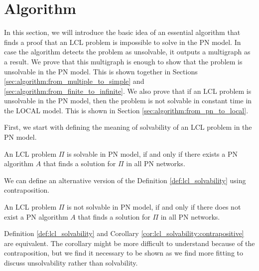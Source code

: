 
\section{Algorithm} \label{sec:algorithm}

In this section, we will introduce the basic idea of an essential algorithm that finds a proof that an LCL problem is impossible to solve in the PN model.
In case the algorithm detects the problem as unsolvable, it outputs a multigraph as a result.
We prove that this multigraph is enough to show that the problem is unsolvable in the PN model.
This is shown together in Sections \ref{sec:algorithm:from_multiple_to_simple} and \ref{sec:algorithm:from_finite_to_infinite}.
We also prove that if an LCL problem is unsolvable in the PN model, then the problem is not solvable in constant time in the LOCAL model.
This is shown in Section \ref{sec:algorithm:from_pn_to_local}.

%
First, we start with defining the meaning of solvability of an LCL problem in the PN model.
\begin{definition} \label{def:lcl_solvability}
    An LCL problem $\Pi$ is solvable in PN model, if and only if there exists a PN algorithm $A$ that finds a solution for $\Pi$ in all PN networks.
\end{definition}

We can define an alternative version of the Definition \ref{def:lcl_solvability} using contraposition.
\begin{corollary} \label{cor:lcl_solvability:contrapositive}
An LCL problem $\Pi$ is not solvable in PN model, if and only if there does not exist a PN algorithm $A$ that finds a solution for $\Pi$ in all PN networks.
\end{corollary}

Definition \ref{def:lcl_solvability} and Corollary \ref{cor:lcl_solvability:contrapositive} are equivalent. The corollary might be more difficult to understand because of the contraposition, but we find it necessary to be shown as we find more fitting to discuss unsolvability rather than solvability.

